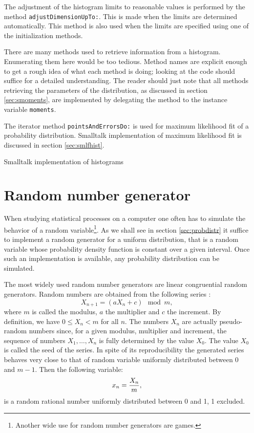 \documentclass[twoside]{book}
\begin{document}
The adjustment of the histogram limits to reasonable values is
performed by the method {\tt adjustDimensionUpTo:}. This is made
when the limits are determined automatically. This method is also
used when the limits are specified using one of the initialization
methods.

There are many methods used to retrieve information from a
histogram. Enumerating them here would be too tedious. Method
names are explicit enough to get a rough idea of what each method
is doing; looking at the code should suffice for a detailed
understanding. The reader should just note that all methods
retrieving the parameters of the distribution, as discussed in
section \ref{sec:smoments}, are implemented by delegating the
method to the instance variable {\tt moments}.

The iterator method {\tt pointsAndErrorsDo:} is used for maximum
likelihood fit of a probability distribution. Smalltalk
implementation of maximum likelihood fit is discussed in section
\ref{sec:smlfhist}.

\begin{listing} Smalltalk implementation of histograms \label{ls:histogram}

\end{listing}


\section{Random number generator}
\label{sec:random} When studying statistical processes on a
computer one often has to simulate the behavior of a random
variable\footnote{Another wide use for random number generators
are games.}. As we shall see in section \ref{sec:probdistr} it
suffice to implement a random generator for a uniform
distribution, that is a random variable whose probability density
function is constant over a given interval. Once such an
implementation is available, any probability distribution can be
simulated.

 The most widely
used random number generators are linear congruential random
generators. Random numbers are obtained from the following series
\cite{Knuth2}:
\begin{equation}
\label{eq:crg}
  X_{n+1} = \left(aX_n+c\right) \mod m,
\end{equation}
where $m$ is called the modulus, $a$ the multiplier and $c$ the
increment. By definition, we have $0\leq X_n<m$ for all $n$. The
numbers $X_n$ are actually pseudo-random numbers since, for a
given modulus, multiplier and increment, the sequence of numbers
$X_1,\ldots,X_n$ is fully determined by the value $X_0$. The value
$X_0$ is called the seed of the series. In spite of its
reproducibility the generated series behaves very close to that of
random variable uniformly distributed between 0 and $m-1$. Then
the following variable:
\begin{equation}
  x_n = {X_n \over m},
\end{equation}
is a random rational number uniformly distributed between 0 and 1,
1 excluded.
\end{document}
